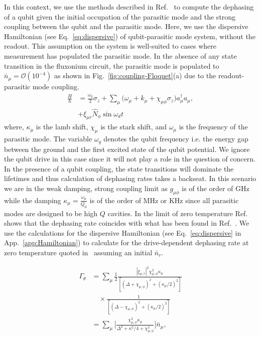 \documentclass[%
reprint,
superscriptaddress,
 amsmath,amssymb,
 aps,
 prx,
longbibliography,
floatfix,
]{revtex4-2}
\begin{document}
In this context, we use the methods described in Ref.~\cite{clerk2007using} to compute the dephasing of a qubit given the initial occupation of the parasitic mode and the strong coupling between the qubit and the parasitic mode. Here, we use the dispersive Hamiltonian (see Eq.~\ref{eq:dispersive}) of qubit-parasitic mode system, without the readout. This assumption on the system is well-suited to cases where measurement has populated the parasitic mode. In the absence of any state transition in the fluxonium circuit, the parasitic mode is populated to $\bar n_\mu=\mathcal{O}(10^{-4})$ as shown in Fig.~\ref{fig:coupling-Floquet}(a) due to the readout-parasitic mode coupling.
\begin{align}
\frac{H}{\hbar}&=\frac{\omega_q}{2}\sigma_z+\sum_{\mu}\Big(\omega_\mu+k_\mu+\chi_{\mu\phi}\sigma_z\Big) a_\mu^\dagger a_\mu,\\
&+\xi_{\mu r}\hat N_\phi\sin{\omega_d t}
\end{align}
where, $\kappa_\mu$ is the lamb shift, $\chi_\mu$ is the stark shift, and $\omega_\mu$ is the frequency of the parasitic mode. The variable $\omega_q$ denotes the qubit frequency i.e. the energy gap between the ground and the first excited state of the qubit potential. We ignore the qubit drive in this case since it will not play a role in the question of concern. In the presence of a qubit coupling, the state transitions will dominate the lifetimes and thus calculation of dephasing rates takes a backseat. In this scenario we are in the weak damping, strong coupling limit as $g_{\mu\phi}$ is of the order of GHz while the damping $\kappa_\mu=\frac{\omega_\mu}{Q_\mu}$ is of the order of MHz or KHz since all parasitic modes are designed to be high $Q$ cavities. In the limit of zero temperature Ref.~\cite{clerk2007using} shows that the dephasing rate coincides with what has been found in Ref.~\cite{gambetta2006qubit}. We use the calculations for the dispersive Hamiltonian (see Eq.~\ref{eq:dispersive} in App.~\ref{app:Hamiltonian}) to calculate for the drive-dependent dephasing rate at zero temperature quoted in~\cite{gambetta2006qubit,clerk2007using} assuming an initial $\bar n_r$.

\begin{align}
    \Gamma_\theta&=\sum_\mu \frac{1}{2}\frac{|\xi_{\mu,r}|^2\chi_{\mu,\phi}^2\kappa_\mu}{[(\Delta+\chi_{\mu,\phi})^2+(\kappa_\mu/2)^2]}\nonumber\\
    &\quad\times\frac{1}{[(\Delta-\chi_{\mu,\phi})^2+(\kappa_\mu/2)^2]}\\
&=\sum_\mu \Big[\frac{\chi_{\mu,\phi}^2\kappa_\mu}{\Delta^2+\kappa^2/4+\chi_{\mu,\phi}^2}\Big]\bar n_\mu,\label{eq:dephasing}
\end{align}
\end{document}
